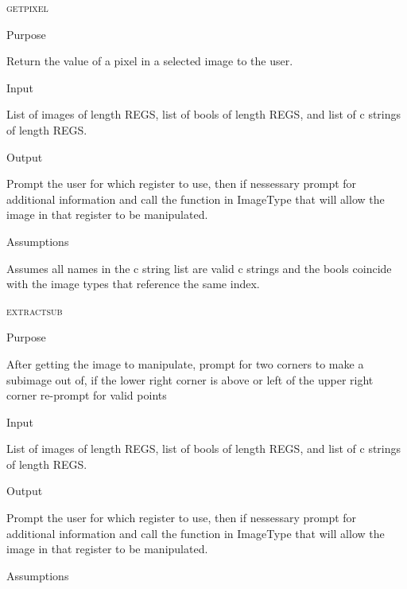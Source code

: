 \documentclass[pdftex, 11pt]{article}
\begin{document}
\begin{description}
\begin{description}
		\end{description}



	\item{\textsc{getpixel}}
		\begin{description}
			\item{Purpose}

				Return the value of a pixel in a selected image to the user.

			\item{Input}

				List of images of length REGS, list of bools of length
				REGS, and list of c strings of length REGS.

			\item{Output}

				Prompt the user for which register to use, then if nessessary
				prompt for additional information and call the function
				in ImageType that will allow the image in that register to
				be manipulated.

			\item{Assumptions}

				Assumes all names in the c string list are valid c
				strings and the bools coincide with the image types that
				reference the same index.

		\end{description}



	\item{\textsc{extractsub}}
		\begin{description}
			\item{Purpose}

				After getting the image to manipulate, prompt for two corners to make a
				subimage out of, if the lower right corner is above or left of the upper
				right corner re-prompt for valid points

			\item{Input}

				List of images of length REGS, list of bools of length
				REGS, and list of c strings of length REGS.

			\item{Output}

				Prompt the user for which register to use, then if nessessary
				prompt for additional information and call the function
				in ImageType that will allow the image in that register to
				be manipulated.

			\item{Assumptions}


\end{description}
\end{description}
\end{document}
